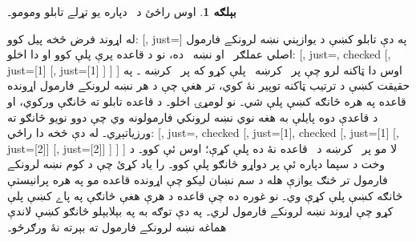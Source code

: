 \documentclass[12pt,a4paper,oneside]{report}
\newenvironment{oltableau}
  {\center\LTR\tableau{}}
  {\endtableau\endLTR\endcenter}
\theoremstyle{definition}
\newtheorem{ex}[thm]{بېلګه}
\begin{document}
\label{olpseg:OLP-0103-B010:start}
\begin{ex}
اوس راځئ د~ دپاره يو تړلے تابلو ومومو۔
\label{olpseg:OLP-0103-B010:end}

\label{olpseg:OLP-0103-B011:start}
له اړوند فرض څخه پيل کوو:
\begin{oltableau}
  [, just=\TAss]
\end{oltableau}
په دې تابلو کښې د يوازېني نښه لرونکے فارمول
اصلي عملګر~\LR{$\lif$} او نښه~\LR{$\False$} ده، نو د
\LR{$\TRule{\False}{\lif}$} قاعده پرې پلې کوو او دا اخلو:
\begin{oltableau}
  [, just=\TAss, checked
    [,
      just={\TRule{\False}{\lif}[1]}
      [,
        just={\TRule{\False}{\lif}[1]}
      ]
    ]
  ]
\end{oltableau}
اوس دا ټاکنه لرو چې پر~ کرښه~\LR{$\TRule{\True}{\lor}$} پلې کړو
که پر~ کرښه \LR{$\TRule{\False}{\lif}$}۔ په حقيقت کښې د ترتيب
ټاکنه توپير نۀ کوي، تر هغې چې د هر نښه لرونکے فارمول اړونده قاعده
په هره څانګه کښې پلې شي۔ نو لومړۍ اخلو۔ د
\LR{$\TRule{\True}{\lor}$} قاعده تابلو ته څانګې ورکوي، او د
قاعدې دوه پايلې به هغه نوي نښه لرونکي فارمولونه وي چې دوو نويو
څانګو ته ورزياتېږي۔ له دې څخه دا راځي:
\begin{oltableau}
  [, just=\TAss, checked
    [,
      just={\TRule{\False}{\lif}[1]}, checked
      [,
        just={\TRule{\False}{\lif}[1]}
        [, just={\TRule{\True}{\lor}[2]}]
        [, just={\TRule{\True}{\lor}[2]}]
      ]
    ]
  ]
\end{oltableau}
لا مو پر~ کرښه د~\LR{$\TRule{\False}{\lif}$} قاعده نۀ ده پلې
کړې؛ اوس ئې کوو۔ د وخت د سپما دپاره ئې پر دواړو څانګو پلې کوو۔
را ياد کړئ چې د کوم نښه لرونکے فارمول تر څنګ يوازې هله د سم نښان
ليکو چې اړونده قاعده مو په هره پرانيستې څانګه کښې پلې کړې وي۔ نو
غوره ده چې قاعده د هرې هغې څانګې په پاے کښې پلې کړو چې اړوند
نښه لرونکے فارمول لري۔ په دې توګه به په بېلابېلو څانګو کښې لاندې
هماغه نښه لرونکے فارمول ته بېرته نۀ ورګرځو۔
\begin{oltableau}

\end{oltableau}
\end{ex}
\end{document}
